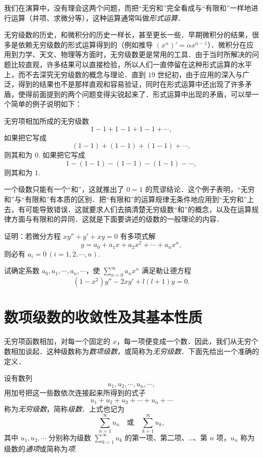我们在演算中，没有理会这两个问题，而把``无穷和''完全看成与``有限和''一样地进行运算（并项、求微分等），这种运算通常叫做\emph{形式运算}．

无穷级数的历史，和微积分的历史一样长，甚至更长一些．早期微积分的结果，很多是依赖无穷级数的形式运算得到的（例如推导 $(x^{\alpha})'=\alpha x^{\alpha-1}$）．微积分在应用到力学、天文、物理等方面时，无穷级数更是常用的工具．由于当时所解决的问题比较直观，许多结果可以直接检验，所以人们一直停留在这种形式运算的水平上，而不去深究无穷级数的概念与理论．直到 $19$ 世纪初，由于应用的深入与广泛，得到的结果也不是那样直观和容易验证，同时在形式运算中还出现了许多矛盾，使得前面提到的两个问题变得尖锐起来了．形式运算中出现的矛盾，可以举一个简单的例子说明如下：

无穷项相加所成的无穷级数
\[
1-1+1-1+1-1+\cdots,
\]
如果把它写成
\[
(1-1)+(1-1)+(1-1)+\cdots,
\]
则其和为 $0$. 如果把它写成
\[
1-(1-1)-(1-1)-(1-1)-\cdots,
\]
则其和为 $1$.

一个级数只能有一个``和''，这就推出了 $0=1$ 的荒谬结论．这个例子表明，``无穷和''与``有限和''有本质的区别．把``有限和''的运算规律无条件地应用到``无穷和''上去，有可能导致错误．这就要求人们去搞清楚无穷级数``和''的概念，以及在运算规律方面与有限和的异同．这就是下面要讲述的级数的一般理论的内容．

\begin{xiti}
\item 证明：若微分方程 $xy''+y'+xy=0$ 有多项式解
\[
y=a_{0}+a_{1}x+a_{2}x^{2}+\cdots+a_{n}x^{n},
\]
则必有 $a_{i}=0\,(i=1,2,\cdots,n)$.
\item 试确定系数 $a_{0},a_{1},\cdots,a_{n},\cdots$，使 $\displaystyle\sum_{n=0}^{\infty}a_{n}x^{n}$ 满足勒让德方程
\[
(1-x^{2})y''-2xy'+l(l+1)y=0.
\]
\end{xiti}

\section{数项级数的收敛性及其基本性质}

无穷项函数相加，对每一个固定的 $x$，每一项便变成一个数．因此，我们从无穷个数相加谈起．这种级数称为\emph{数项级数}，或简称为\emph{无穷级数}．下面先给出一个准确的定义．

设有数列
\[
u_{1},u_{2},\cdots,u_{n},\cdots,
\]
用加号把这一些数依次连接起来所得到的式子
\[
u_{1}+u_{2}+u_{3}+\cdots+u_{n}+\cdots
\]
称为\emph{无穷级数}，简称\emph{级数}．上式也记为
\[
\sum_{n=1}^{\infty}u_{n}\quad\text{或}\quad\sum_{k=1}^{\infty}u_{k},
\]
其中 $u_{1},u_{2},\cdots$ 分别称为级数 $\sum_{k=1}^{\infty}u_{k}$ 的第一项、第二项、…、第 $n$ 项，$u_{n}$ 称为级数的\emph{通项}或简称为\emph{项}.

